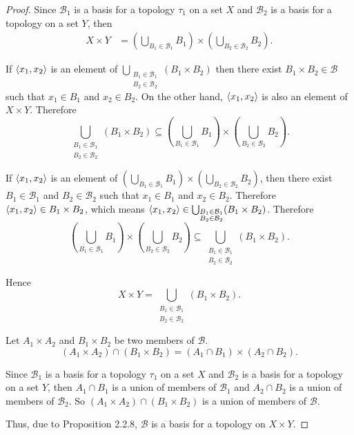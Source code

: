 \begin{proof}
	Since $\mathcal{B}_{1}$ is a basis for a topology $\tau_{1}$ on a set $X$ and $\mathcal{B}_{2}$ is a basis for a topology on a set $Y$, then
	\begin{align*}
		X\times Y & = \left(\bigcup_{B_{1}\in\mathcal{B}_{1}} B_{1}\right) \times \left(\bigcup_{B_{2}\in \mathcal{B}_{2}} B_{2}\right).
	\end{align*}

	If $\left\langle{x_{1}, x_{2}}\right\rangle$ is an element of $\bigcup_{\substack{B_{1}\in \mathcal{B}_{1} \\ B_{2}\in \mathcal{B}_{2}}} (B_{1}\times B_{2})$ then there exist $B_{1}\times B_{2} \in \mathcal{B}$ such that $x_{1}\in B_{1}$ and $x_{2}\in B_{2}$. On the other hand, $\left\langle{x_{1}, x_{2}}\right\rangle$ is also an element of $X\times Y$. Therefore
	\[
		\bigcup_{\substack{B_{1}\in \mathcal{B}_{1} \\ B_{2}\in \mathcal{B}_{2}}} (B_{1}\times B_{2}) \subseteq \left(\bigcup_{B_{1}\in\mathcal{B}_{1}} B_{1}\right) \times \left(\bigcup_{B_{2}\in \mathcal{B}_{2}} B_{2}\right).
	\]

	If $\left\langle{x_{1}, x_{2}}\right\rangle$ is an element of $\left(\bigcup_{B_{1}\in\mathcal{B}_{1}} B_{1}\right) \times \left(\bigcup_{B_{2}\in \mathcal{B}_{2}} B_{2}\right)$, then there exist $B_{1}\in \mathcal{B}_{1}$ and $B_{2}\in \mathcal{B}_{2}$ such that $x_{1}\in B_{1}$ and $x_{2}\in B_{2}$. Therefore $\left\langle{x_{1}, x_{2}}\right\rangle\in B_{1}\times B_{2}$, which means $\left\langle{x_{1}, x_{2}}\right\rangle \in \bigcup_{\substack{B_{1}\in \mathcal{B}_{1} \\ B_{2}\in \mathcal{B}_{2}}} (B_{1}\times B_{2})$. Therefore
	\[
		\left(\bigcup_{B_{1}\in\mathcal{B}_{1}} B_{1}\right) \times \left(\bigcup_{B_{2}\in \mathcal{B}_{2}} B_{2}\right) \subseteq \bigcup_{\substack{B_{1}\in \mathcal{B}_{1} \\ B_{2}\in \mathcal{B}_{2}}} (B_{1}\times B_{2}).
	\]

	Hence
	\[
		X\times Y = \bigcup_{\substack{B_{1}\in \mathcal{B}_{1} \\ B_{2}\in \mathcal{B}_{2}}} (B_{1}\times B_{2}).
	\]

	Let $A_{1}\times A_{2}$ and $B_{1}\times B_{2}$ be two members of $\mathcal{B}$.
	\[
		(A_{1}\times A_{2})\cap (B_{1}\times B_{2}) = (A_{1}\cap B_{1})\times (A_{2}\cap B_{2}).
	\]

	Since $\mathcal{B}_{1}$ is a basis for a topology $\tau_{1}$ on a set $X$ and $\mathcal{B}_{2}$ is a basis for a topology on a set $Y$, then $A_{1}\cap B_{1}$ is a union of members of $\mathcal{B}_{1}$ and $A_{2}\cap B_{2}$ is a union of members of $\mathcal{B}_{2}$. So $(A_{1}\times A_{2})\cap (B_{1}\times B_{2})$ is a union of members of $\mathcal{B}$.

	Thus, due to Proposition 2.2.8, $\mathcal{B}$ is a basis for a topology on $X\times Y$.
\end{proof}
\newpage

